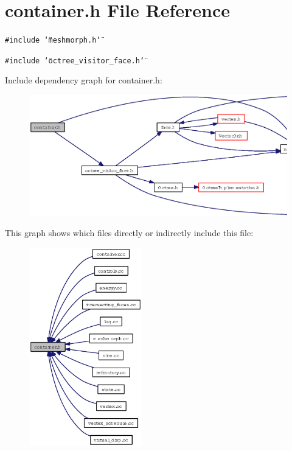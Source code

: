 \section{container.h File Reference}
\label{container_8h}
{\tt \#include \char`\"{}meshmorph.h\char`\"{}}\par
{\tt \#include \char`\"{}octree\_\-visitor\_\-face.h\char`\"{}}\par


Include dependency graph for container.h:\begin{figure}[H]
\begin{center}
\leavevmode
\includegraphics[width=398pt]{container_8h__incl}
\end{center}
\end{figure}


This graph shows which files directly or indirectly include this file:\begin{figure}[H]
\begin{center}
\leavevmode
\includegraphics[width=139pt]{container_8h__dep__incl}
\end{center}
\end{figure}
